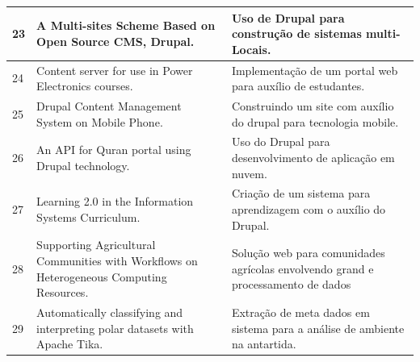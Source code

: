 \begin{apendicesenv}
\begin{landscape}
\begin{longtable}{|p{10pt}|p{320pt}|p{315pt}|}
  	 	  	 	
  	 	  	 	{\raggedright 23}
  	 	  	 	 	 	 & {\raggedright A {Multi}-sites {Scheme} {Based} on {Open} {Source} {CMS}, {Drupal}. }
  	 	  	 	 	 	 & {\raggedright Uso de Drupal para construção de sistemas multi-Locais.\cite{Jinwei2010}} \\
  	 	  	 	 	 	\hline
  	 	  	 	 	 	
  	 	  
  	 	   
  	 	   {\raggedright 24}
  	 	    	 	 & {\raggedright Content server for use in {Power} {Electronics} courses.}
  	 	    	 	 & {\raggedright Implementação de um portal web para auxílio de estudantes. \cite{Serdio2010}} \\
  	 	    	 	\hline
  	 	    	 	
  	 	    	 	
  	 	  {\raggedright 25}
  	 	   	 	 & {\raggedright Drupal {Content} {Management} {System} on {Mobile} {Phone}.}
  	 	   	 	 & {\raggedright Construindo um site com auxílio do drupal para tecnologia mobile.\cite{Nurminen2008}} \\
  	 	   	 	\hline
  	 	   	 	
	{\raggedright 26}
 	 	  	 & {\raggedright An {API} for {Quran} portal using {Drupal} technology.}
 	 	  	 	 	 	 	 	 & {\raggedright Uso do Drupal para desenvolvimento de aplicação em nuvem. \cite{Adhoni2014}} \\
 	 	  	 	 	 	 	 	\hline
 	 	  	 	
 	 	  	 {\raggedright 27}
 	 	  	  	 	   	 	 & {\raggedright Learning 2.0 in the {Information} {Systems} {Curriculum}.}
 	 	  	  	 	   	 	 & {\raggedright Criação de um sistema para aprendizagem com o auxílio do Drupal.\cite{Albrecht2009}} \\
 	 	  	  	 	   	 	\hline	
 	 	  	 	
 	 	  	 	
 	 	  	 	{\raggedright 28}
 	 	  	 	 	 	 & {\raggedright Supporting {Agricultural} {Communities} with {Workflows} on {Heterogeneous} {Computing} {Resources}. }
 	 	  	 	 	 	 & {\raggedright Solução web para comunidades agrícolas envolvendo grand e processamento de dados\cite{Balasko2014}} \\
 	 	  	 	 	 	\hline
 	 	  	 	 	 	
 	 	  
 	 	   
 	 	   {\raggedright 29}
 	 	    	 	 & {\raggedright Automatically classifying and interpreting polar datasets with {Apache} {Tika}.}
 	 	    	 	 & {\raggedright Extração de meta dados em sistema para a análise de ambiente na antartida.\cite{Burgess2014}} \\
 	 	    	 	\hline
 	 	    	 	

\end{longtable}
\end{landscape}
\end{apendicesenv}
